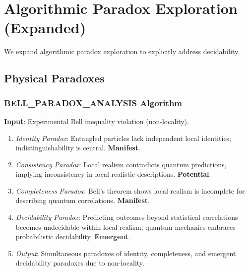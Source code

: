 	\section{Algorithmic Paradox Exploration (Expanded)}
	
	We expand algorithmic paradox exploration to explicitly address decidability.
	
	\subsection{Physical Paradoxes}
	
	\subsubsection{BELL\_PARADOX\_ANALYSIS Algorithm}
	\textbf{Input}: Experimental Bell inequality violation (non-locality).
	\begin{enumerate}
		\item \textit{Identity Paradox}: Entangled particles lack independent local identities; indistinguishability is central. \textbf{Manifest}.
		\item \textit{Consistency Paradox}: Local realism contradicts quantum predictions, implying inconsistency in local realistic descriptions. \textbf{Potential}.
		\item \textit{Completeness Paradox}: Bell's theorem shows local realism is incomplete for describing quantum correlations. \textbf{Manifest}.
		\item \textit{Decidability Paradox}:  Predicting outcomes beyond statistical correlations becomes undecidable within local realism; quantum mechanics embraces probabilistic decidability. \textbf{Emergent}.
		\item \textit{Output}: Simultaneous paradoxes of identity, completeness, and emergent decidability paradoxes due to non-locality.
	\end{enumerate}
	
